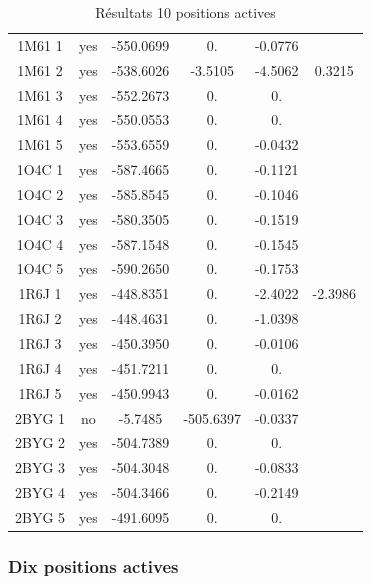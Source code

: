 \begin{table}[h]
\begin{tabular}{|c|c|c|c|c|c|}
        1M61 1 & yes & -550.0699 & 0. & -0.0776 & \\
        1M61 2 & yes & -538.6026 & -3.5105 & -4.5062 & 0.3215 \\
        1M61 3 & yes & -552.2673 & 0. & 0. & \\
        1M61 4 & yes & -550.0553 & 0. & 0. & \\
        1M61 5 & yes & -553.6559 & 0. & -0.0432 & \\
        1O4C 1 & yes & -587.4665 & 0. & -0.1121 & \\
        1O4C 2 & yes & -585.8545 & 0. & -0.1046 & \\
        1O4C 3 & yes & -580.3505 & 0. & -0.1519 & \\
        1O4C 4 & yes & -587.1548 & 0. & -0.1545 & \\
        1O4C 5 & yes & -590.2650 & 0. & -0.1753 & \\
        1R6J 1 & yes & -448.8351 & 0. & -2.4022 & -2.3986 \\
        1R6J 2 & yes & -448.4631 & 0. & -1.0398 & \\
        1R6J 3 & yes & -450.3950 & 0. & -0.0106 & \\
        1R6J 4 & yes & -451.7211 & 0. & 0. & \\
        1R6J 5 & yes & -450.9943 & 0. & -0.0162 & \\
        2BYG 1 & no  & -5.7485   & -505.6397 & -0.0337 & \\
        2BYG 2 & yes & -504.7389 & 0. & 0. & \\
        2BYG 3 & yes & -504.3048 & 0. & -0.0833 & \\
        2BYG 4 & yes & -504.3466 & 0. & -0.2149 & \\
        2BYG 5 & yes & -491.6095 & 0. & 0. & \\
        
        \hline


 \end{tabular}      
 \caption{Résultats 10 positions actives }
 \label{tab_echec2BYG__1}      
\end{table}

   \subsubsection{ Dix positions actives}


